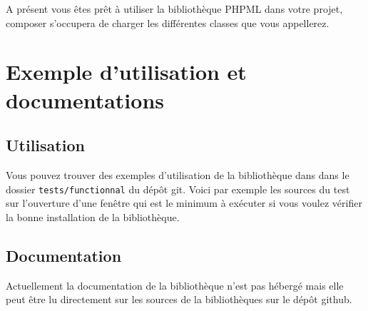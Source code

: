 \documentclass[11pt,a4paper,krantz2,11pt,oneside]{krantz}
\newenvironment{Shaded}{\begin{snugshade}}{\end{snugshade}}
\newcommand{\DecValTok}[1]{\textcolor[rgb]{0.06,0.06,0.06}{#1}}
\newcommand{\KeywordTok}[1]{\textcolor[rgb]{0.27,0.27,0.27}{\textbf{#1}}}
\newcommand{\NormalTok}[1]{#1}
\newcommand{\OtherTok}[1]{\textcolor[rgb]{0.37,0.37,0.37}{#1}}
\newcommand{\StringTok}[1]{\textcolor[rgb]{0.5,0.5,0.5}{#1}}
\begin{document}
A présent vous êtes prêt à utiliser la bibliothèque PHPML dans votre projet, composer s'occupera de charger les différentes classes que vous appellerez.

\hypertarget{exemple-dutilisation-et-documentations}{%
\section{Exemple d'utilisation et documentations}\label{exemple-dutilisation-et-documentations}}

\hypertarget{utilisation}{%
\subsection{Utilisation}\label{utilisation}}

Vous pouvez trouver des exemples d'utilisation de la bibliothèque dans dans le dossier \texttt{tests/functionnal} du dépôt git. Voici par exemple les sources du test sur l'ouverture d'une fenêtre qui est le minimum à exécuter si vous voulez vérifier la bonne installation de la bibliothèque.

\begin{Shaded}
\end{Shaded}

\hypertarget{documentation}{%
\subsection{Documentation}\label{documentation}}

Actuellement la documentation de la bibliothèque n'est pas hébergé mais elle peut être lu directement sur les sources de la bibliothèques sur le dépôt github.
\end{document}
